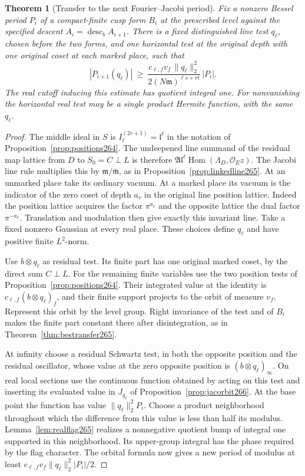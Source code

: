 \documentclass[a4paper,11pt]{article}
\newtheorem{theorem}[proposition]{Theorem}
\theoremstyle{definition}
\theoremstyle{remark}
\numberwithin{equation}{section}
\begin{document}
\begin{theorem}[Transfer to the next Fourier--Jacobi period]\leavevmode
\label{thm:jactransfer266}
Fix a nonzero Bessel period \(P_i\) of a compact-finite cusp
form \(B_i\) at the prescribed level against the specified
descent \(A_i=\operatorname{desc}_b A_{i+1}\).
There is a fixed distinguished line test \(q_\ell\), chosen
before the two forms, and one horizontal test at the original
depth with one original coset at each marked place, such that
\[
   |P_{i+1}(q_\ell)|\ \ge\
       \frac{c_{\ell,f}v_f\,\|q_\ell\|_2^2}
            {2(N\mathfrak m)^{\ell s+rt}}\,|P_i| .
\]
The real cutoff inducing this estimate has quotient integral
one. For nonvanishing the horizontal real test may be a single
product Hermite function, with the same \(q_\ell\).
\end{theorem}
\begin{proof}
The middle ideal in \(S\) is \(I_\ell^{(2r+1)}=\mathfrak l^\ell\)
in the notation of Proposition~\ref{prop:positions264}. The
undeepened line summand of the residual map lattice from \(D\)
to \(S_0=C\perp L\) is therefore
\(\mathfrak A\mathfrak l^\ell
\operatorname{Hom}(\Lambda_D,\mathcal O_E z)\).
The Jacobi line rule multiplies this by
\(\mathfrak m/\bar{\mathfrak m}\), as in
Proposition~\ref{prop:linkedline265}. At an unmarked place
take its ordinary vacuum. At a marked place its vacuum is the
indicator of the zero coset of depth \(a_v\) in the original
line position lattice. Indeed the position lattice acquires
the factor \(\pi^{a_v}\) and the opposite lattice the dual
factor \(\pi^{-a_v}\). Translation and modulation then give
exactly this invariant line. Take a fixed nonzero Gaussian at
every real place. These choices define \(q_\ell\) and have
positive finite \(L^2\)-norm.

Use \(b\otimes q_\ell\) as residual test. Its finite part has
one original marked coset, by the direct sum \(C\perp L\).
For the remaining finite variables use the two position tests
of Proposition~\ref{prop:positions264}. Their integrated value
at the identity is \(c_{\ell,f}(b\otimes q_\ell)_f\), and their
finite support projects to the orbit of measure \(v_f\).
Represent this orbit by the level group. Right invariance of
the test and of \(B_i\) makes the finite part constant there
after disintegration, as in Theorem~\ref{thm:bestransfer265}.

At infinity choose a residual Schwartz test, in both the
opposite position and the residual oscillator, whose value
at the zero opposite position is \((b\otimes q_\ell)_\infty\).
On real local sections use the continuous function obtained
by acting on this test and inserting its evaluated value in
\(J_{q_\ell}\) of Proposition~\ref{prop:jacorbit266}. At the
base point the function has value \(\|q_\ell\|_2^2P_i\).
Choose a product neighborhood throughout which the difference
from this value is less than half its modulus.
Lemma~\ref{lem:realflag265} realizes a nonnegative quotient
bump of integral one supported in this neighborhood. Its
upper-group integral has the phase required by the flag
character. The orbital formula now gives a new period of
modulus at least \(c_{\ell,f}v_f\|q_\ell\|_2^2|P_i|/2\).


\end{proof}
\end{document}
